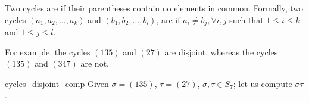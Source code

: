 
\begin{defn} \label{disjoint_cycles} 
Two cycles are  if their parentheses contain no elements in common.  Formally,
two cycles $(a_1, a_2, \ldots, a_k )$ and $(b_1, b_2, \ldots, b_l )$, are 
if $a_i \neq b_j, \forall i, j $ such that $1 \le i \le k$ and $1 \le j \le l$. 
\end{defn}

\noindent
For example, the  cycles $(135)$ and $(27 )$ are disjoint, whereas the cycles
$(135)$ and $(347 )$ are not.  

\begin{example}{cycles_disjoint_comp}
Given $\sigma = (135)$, $\tau = (27)$, $\sigma , \tau \in S_7$; let us compute $\sigma \tau$. 
%
%
%
%
%


\end{example}
